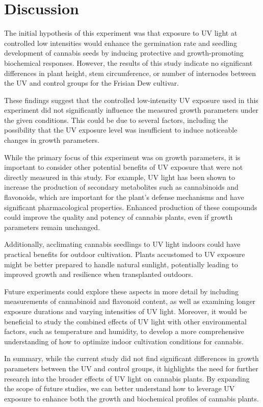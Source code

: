 \section{Discussion}

The initial hypothesis of this experiment was that exposure to UV light at controlled low intensities would enhance the germination rate and seedling development of cannabis seeds by inducing protective and growth-promoting biochemical responses. However, the results of this study indicate no significant differences in plant height, stem circumference, or number of internodes between the UV and control groups for the Frisian Dew cultivar.

These findings suggest that the controlled low-intensity UV exposure used in this experiment did not significantly influence the measured growth parameters under the given conditions. This could be due to several factors, including the possibility that the UV exposure level was insufficient to induce noticeable changes in growth parameters.

While the primary focus of this experiment was on growth parameters, it is important to consider other potential benefits of UV exposure that were not directly measured in this study. For example, UV light has been shown to increase the production of secondary metabolites such as cannabinoids and flavonoids, which are important for the plant's defense mechanisms and have significant pharmacological properties. Enhanced production of these compounds could improve the quality and potency of cannabis plants, even if growth parameters remain unchanged.

Additionally, acclimating cannabis seedlings to UV light indoors could have practical benefits for outdoor cultivation. Plants accustomed to UV exposure might be better prepared to handle natural sunlight, potentially leading to improved growth and resilience when transplanted outdoors.

Future experiments could explore these aspects in more detail by including measurements of cannabinoid and flavonoid content, as well as examining longer exposure durations and varying intensities of UV light. Moreover, it would be beneficial to study the combined effects of UV light with other environmental factors, such as temperature and humidity, to develop a more comprehensive understanding of how to optimize indoor cultivation conditions for cannabis.

In summary, while the current study did not find significant differences in growth parameters between the UV and control groups, it highlights the need for further research into the broader effects of UV light on cannabis plants. By expanding the scope of future studies, we can better understand how to leverage UV exposure to enhance both the growth and biochemical profiles of cannabis plants.